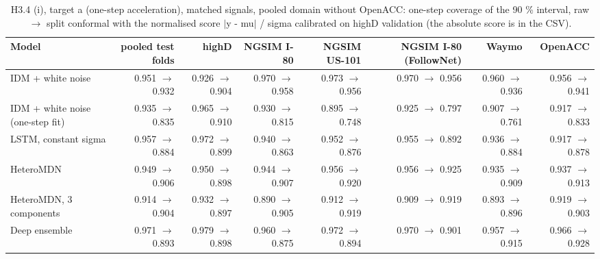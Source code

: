 \begin{table}[htbp]
\centering
\footnotesize
\caption{H3.4 (i), target a (one-step acceleration), matched signals, pooled domain without OpenACC: one-step coverage of the 90 \% interval, raw $\rightarrow$ split conformal with the normalised score $|$y - mu$|$ / sigma calibrated on highD validation (the absolute score is in the CSV).}
\label{tab:t4-onestep-conformal--lodo-openacc--a}
\begin{tabular}{lrrrrrrr}
\toprule
Model & pooled test folds & highD & NGSIM I-80 & NGSIM US-101 & NGSIM I-80 (FollowNet) & Waymo & OpenACC \\
\midrule
IDM + white noise & 0.951 $\rightarrow$ 0.932 & 0.926 $\rightarrow$ 0.904 & 0.970 $\rightarrow$ 0.958 & 0.973 $\rightarrow$ 0.956 & 0.970 $\rightarrow$ 0.956 & 0.960 $\rightarrow$ 0.936 & 0.956 $\rightarrow$ 0.941 \\
IDM + white noise (one-step fit) & 0.935 $\rightarrow$ 0.835 & 0.965 $\rightarrow$ 0.910 & 0.930 $\rightarrow$ 0.815 & 0.895 $\rightarrow$ 0.748 & 0.925 $\rightarrow$ 0.797 & 0.907 $\rightarrow$ 0.761 & 0.917 $\rightarrow$ 0.833 \\
LSTM, constant sigma & 0.957 $\rightarrow$ 0.884 & 0.972 $\rightarrow$ 0.899 & 0.940 $\rightarrow$ 0.863 & 0.952 $\rightarrow$ 0.876 & 0.955 $\rightarrow$ 0.892 & 0.936 $\rightarrow$ 0.884 & 0.917 $\rightarrow$ 0.878 \\
HeteroMDN & 0.949 $\rightarrow$ 0.906 & 0.950 $\rightarrow$ 0.898 & 0.944 $\rightarrow$ 0.907 & 0.956 $\rightarrow$ 0.920 & 0.956 $\rightarrow$ 0.925 & 0.935 $\rightarrow$ 0.909 & 0.937 $\rightarrow$ 0.913 \\
HeteroMDN, 3 components & 0.914 $\rightarrow$ 0.904 & 0.932 $\rightarrow$ 0.897 & 0.890 $\rightarrow$ 0.905 & 0.912 $\rightarrow$ 0.919 & 0.909 $\rightarrow$ 0.919 & 0.893 $\rightarrow$ 0.896 & 0.919 $\rightarrow$ 0.903 \\
Deep ensemble & 0.971 $\rightarrow$ 0.893 & 0.979 $\rightarrow$ 0.898 & 0.960 $\rightarrow$ 0.875 & 0.972 $\rightarrow$ 0.894 & 0.970 $\rightarrow$ 0.901 & 0.957 $\rightarrow$ 0.915 & 0.966 $\rightarrow$ 0.928 \\

\end{tabular}
\end{table}
